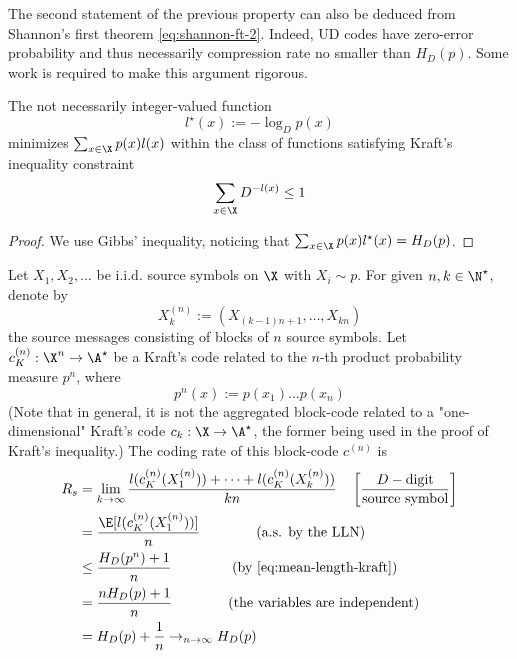 \documentclass[toc]{../cs-classes/cs-classes}
\begin{document}
\begin{remark}
    The second statement of the previous property can also be deduced from Shannon's first theorem \eqref{eq:shannon-ft-2}. Indeed, UD codes have zero-error probability and thus necessarily compression rate no smaller than $H_D(p)$. Some work is required to make this argument rigorous.
\end{remark}

\begin{property}
    The not necessarily integer-valued function
    \begin{equation*}
        l^\star(x):=-\log_Dp(x)
    \end{equation*}
    minimizes $\sum_{x\in\X}p(x)l(x)$ within the class of functions satisfying Kraft's inequality constraint
    \begin{equation*}
        \sum_{x\in\X}D^{-l(x)}\leq 1
    \end{equation*}
\end{property}

\begin{proof}
    We use Gibbs' inequality, noticing that $\sum_{x\in\X}p(x)l^\star(x)=H_D(p)$.
\end{proof}

\begin{corollary}
    Let $X_1, X_2, \dots$ be i.i.d. source symbols on $\X$ with $X_i\sim p$. For given $n, k\in\N^\star$, denote by
    \begin{equation*}
        X_k^{(n)} := (X_{(k-1)n+1}, \dots, X_{kn})
    \end{equation*}
    the source messages consisting of blocks of $n$ source symbols. Let $c_K^{(n)}:\X^n \to \A^\star$ be a Kraft's code related to the $n$-th product probability measure $p^n$, where 
    \begin{equation*}
        p^n(x):=p(x_1)\dots p(x_n)
    \end{equation*}
    (Note that in general, it is not the aggregated block-code related to a "one-dimensional" Kraft's code $c_k:\X\to\A^\star$, the former being used in the proof of Kraft's inequality.) The coding rate of this block-code $c^{(n)}$ is
    \begin{equation*}
        \begin{aligned}
            R_s &= \lim_{k\to\infty} \frac{l(c_K^{(n)}(X_1^{(n)}))+\dots+l(c_K^{(n)}(X_k^{(n)}))}{kn} \quad \left[\frac{D-\textnormal{digit}}{\textnormal{source symbol}}\right]\\
            &= \frac{\E[l(c_K^{(n)}(X_1^{(n)}))]}{n} \qquad\qquad \textnormal{(a.s. by the LLN)}\\
            &\leq \frac{H_D(p^n)+1}{n} \qquad\qquad \textnormal{(by \eqref{eq:mean-length-kraft})}\\
            &= \frac{nH_D(p)+1}{n} \qquad\qquad \textnormal{(the variables are independent)}\\
            &=H_D(p)+\frac{1}{n} \to_{n\to\infty} H_D(p)
        \end{aligned}
    \end{equation*}
\end{corollary}
\end{document}

